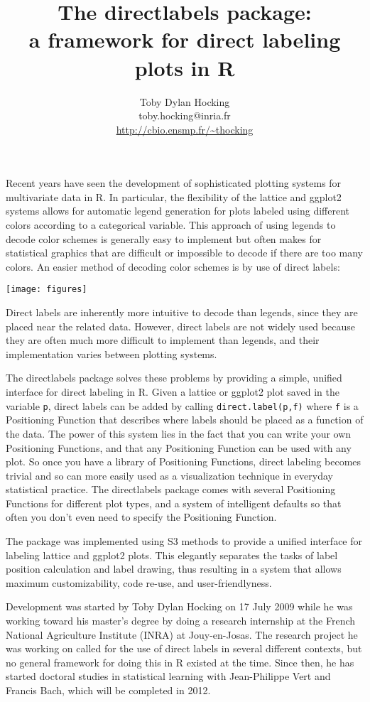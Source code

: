 \documentclass[12pt]{article}
\title{The directlabels package:\\ a framework for direct
  labeling plots in R}
\author{Toby Dylan Hocking\\
  toby.hocking@inria.fr\\
  \url{http://cbio.ensmp.fr/~thocking}
}
\begin{document}
\maketitle

Recent years have seen the development of sophisticated plotting
systems for multivariate data in R. In particular, the flexibility of
the lattice and ggplot2 systems allows for automatic legend generation
for plots labeled using different colors according to a categorical
variable. This approach of using legends to decode color schemes is
generally easy to implement but often makes for statistical graphics
that are difficult or impossible to decode if there are too many
colors. An easier method of decoding color schemes is by use of direct
labels:

\begin{center}
\texttt{[image: figures]}
\end{center}

Direct labels are inherently more intuitive to decode than legends,
since they are placed near the related data. However, direct labels
are not widely used because they are often much more difficult to
implement than legends, and their implementation varies between
plotting systems.

The directlabels package solves these problems by providing a simple,
unified interface for direct labeling in R. Given a lattice or ggplot2
plot saved in the variable \texttt{p}, direct labels can be added by
calling \texttt{direct.label(p,f)} where \texttt{f} is a Positioning
Function that describes where labels should be placed as a function of
the data. The power of this system lies in the fact that you can write
your own Positioning Functions, and that any Positioning Function can
be used with any plot. So once you have a library of Positioning
Functions, direct labeling becomes trivial and so can more easily used
as a visualization technique in everyday statistical practice. The
directlabels package comes with several Positioning Functions for
different plot types, and a system of intelligent defaults so that
often you don't even need to specify the Positioning Function.

The package was implemented using S3 methods to provide a unified
interface for labeling lattice and ggplot2 plots. This elegantly
separates the tasks of label position calculation and label drawing,
thus resulting in a system that allows maximum customizability, code
re-use, and user-friendlyness.

Development was started by Toby Dylan Hocking on 17 July 2009 while he
was working toward his master's degree by doing a research internship
at the French National Agriculture Institute (INRA) at
Jouy-en-Josas. The research project he was working on called for the
use of direct labels in several different contexts, but no general
framework for doing this in R existed at the time. Since then, he has
started doctoral studies in statistical learning with Jean-Philippe
Vert and Francis Bach, which will be completed in 2012.
\end{document}
